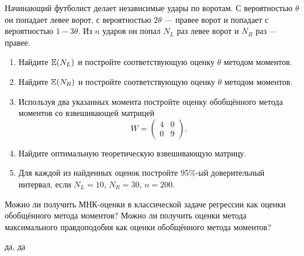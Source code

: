 \begin{problem}
Начинающий футболист делает независимые удары по воротам. С вероятностью $\theta$ он попадает левее ворот, с вероятностью $2\theta$ — правее ворот и попадает с вероятностью $1-3\theta$. Из $n$ ударов он попал $N_L$ раз левее ворот и $N_R$ раз — правее.

\begin{enumerate}
\item Найдите $\operatorname{\mathbb E}(N_L)$ и постройте соответствующую оценку $\theta$ методом моментов.
\item Найдите $\operatorname{\mathbb E}(N_R)$ и постройте соответствующую оценку $\theta$ методом моментов.
\item Используя два указанных момента постройте оценку обобщённого метода моментов со  взвешивающей матрицей
\[
W = \begin{pmatrix}
4 & 0 \\
0 & 9
\end{pmatrix}.
\]
\item Найдите оптимальную теоретическую взвешивающую матрицу.
\item Для каждой из найденных оценок постройте 95\%-ый доверительный интервал, если $N_L=10$, $N_R=30$, $n=200$.
\end{enumerate}
\begin{sol}
\end{sol}
\end{problem}



\begin{problem}
Можно ли получить МНК-оценки в классической задаче регрессии как оценки обобщённого метода моментов? Можно ли получить оценки метода максимального правдоподобия как оценки обобщённого метода моментов?
\begin{sol}
да, да
\end{sol}
\end{problem}


